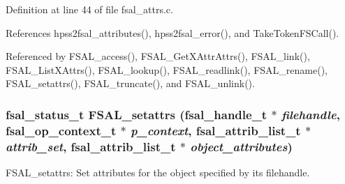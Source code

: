 Definition at line 44 of file fsal\_\-attrs.c.

References hpss2fsal\_\-attributes(), hpss2fsal\_\-error(), and TakeTokenFSCall().

Referenced by FSAL\_\-access(), FSAL\_\-GetXAttrAttrs(), FSAL\_\-link(), FSAL\_\-ListXAttrs(), FSAL\_\-lookup(), FSAL\_\-readlink(), FSAL\_\-rename(), FSAL\_\-setattrs(), FSAL\_\-truncate(), and FSAL\_\-unlink().
\subsubsection[{FSAL\_\-setattrs}]{\setlength{\rightskip}{0pt plus 5cm}fsal\_\-status\_\-t FSAL\_\-setattrs (fsal\_\-handle\_\-t $\ast$ {\em filehandle}, \/  fsal\_\-op\_\-context\_\-t $\ast$ {\em p\_\-context}, \/  fsal\_\-attrib\_\-list\_\-t $\ast$ {\em attrib\_\-set}, \/  fsal\_\-attrib\_\-list\_\-t $\ast$ {\em object\_\-attributes})}\label{fsal__attrs_8c_c0463632f2c08701c012b7885b1d9012}


FSAL\_\-setattrs: Set attributes for the object specified by its filehandle.

